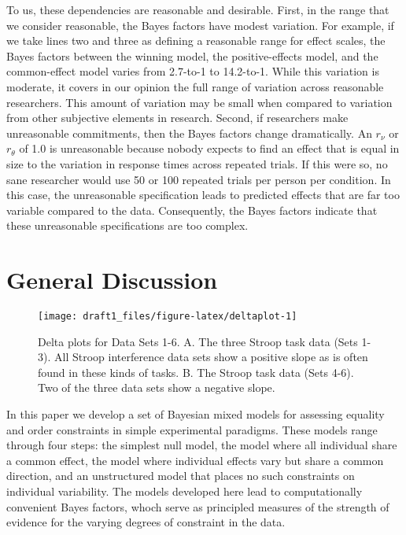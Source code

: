 \documentclass[american,man]{apa6}
\begin{document}
To us, these dependencies are reasonable and desirable. First, in the
range that we consider reasonable, the Bayes factors have modest
variation. For example, if we take lines two and three as defining a
reasonable range for effect scales, the Bayes factors between the
winning model, the positive-effects model, and the common-effect model
varies from 2.7-to-1 to 14.2-to-1. While this variation is moderate, it
covers in our opinion the full range of variation across reasonable
researchers. This amount of variation may be small when compared to
variation from other subjective elements in research. Second, if
researchers make unreasonable commitments, then the Bayes factors change
dramatically. An \(r_\nu\) or \(r_\theta\) of 1.0 is unreasonable
because nobody expects to find an effect that is equal in size to the
variation in response times across repeated trials. If this were so, no
sane researcher would use 50 or 100 repeated trials per person per
condition. In this case, the unreasonable specification leads to
predicted effects that are far too variable compared to the data.
Consequently, the Bayes factors indicate that these unreasonable
specifications are too complex.

\section{General Discussion}\label{general-discussion}

\begin{figure}

{\centering \texttt{[image: draft1\_files/figure-latex/deltaplot-1]} 

}

\caption{Delta plots for Data Sets 1-6. A. The three Stroop task data (Sets 1-3). All Stroop interference data sets show a positive slope as is often found in these kinds of tasks. B. The Stroop task data (Sets 4-6). Two of the three data sets show a negative slope.}\label{fig:deltaplot}
\end{figure}

In this paper we develop a set of Bayesian mixed models for assessing
equality and order constraints in simple experimental paradigms. These
models range through four steps: the simplest null model, the model
where all individual share a common effect, the model where individual
effects vary but share a common direction, and an unstructured model
that places no such constraints on individual variability. The models
developed here lead to computationally convenient Bayes factors, whoch
serve as principled measures of the strength of evidence for the varying
degrees of constraint in the data.
\end{document}
